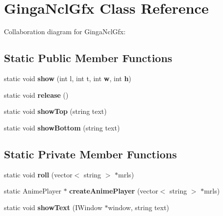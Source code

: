 \section{GingaNclGfx Class Reference}
\label{classbr_1_1pucrio_1_1telemidia_1_1ginga_1_1ncl_1_1GingaNclGfx}
Collaboration diagram for GingaNclGfx:\subsection*{Static Public Member Functions}
\begin{CompactItemize}
\item 
static void \textbf{show} (int l, int t, int {\bf w}, int {\bf h})\label{classbr_1_1pucrio_1_1telemidia_1_1ginga_1_1ncl_1_1GingaNclGfx_bac8ce8c2094c08abf64db6f5039e022}

\item 
static void \textbf{release} ()\label{classbr_1_1pucrio_1_1telemidia_1_1ginga_1_1ncl_1_1GingaNclGfx_9e5d3fad9e601bb8c8c37183aaa737d2}

\item 
static void \textbf{showTop} (string text)\label{classbr_1_1pucrio_1_1telemidia_1_1ginga_1_1ncl_1_1GingaNclGfx_5efe20464d84000397de138fddcc13a2}

\item 
static void \textbf{showBottom} (string text)\label{classbr_1_1pucrio_1_1telemidia_1_1ginga_1_1ncl_1_1GingaNclGfx_c45ccd0268c898fa9fd5f7de72d395f6}

\end{CompactItemize}
\subsection*{Static Private Member Functions}
\begin{CompactItemize}
\item 
static void \textbf{roll} (vector$<$ string $>$ $\ast$mrls)\label{classbr_1_1pucrio_1_1telemidia_1_1ginga_1_1ncl_1_1GingaNclGfx_38179f23e0ef7b45c00bb234ea550654}

\item 
static AnimePlayer $\ast$ \textbf{createAnimePlayer} (vector$<$ string $>$ $\ast$mrls)\label{classbr_1_1pucrio_1_1telemidia_1_1ginga_1_1ncl_1_1GingaNclGfx_7877b4eeeeca021601432ac0b90f41c4}

\item 
static void \textbf{showText} (IWindow $\ast$window, string text)\label{classbr_1_1pucrio_1_1telemidia_1_1ginga_1_1ncl_1_1GingaNclGfx_cb18b0716a419593a278188ad177aff7}

\end{CompactItemize}
